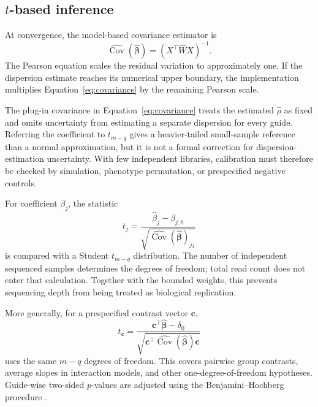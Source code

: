 \subsection{\texorpdfstring{$t$-based inference}{t-based inference}}
\label{sec:inference}

At convergence, the model-based covariance estimator is
\begin{equation}
  \widehat{\operatorname{Cov}}
  (\widehat{\boldsymbol{\beta}})
  =(X^\top\widehat{W}X)^{-1}.
  \label{eq:covariance}
\end{equation}
The Pearson equation scales the residual variation to approximately one.  If
the dispersion estimate reaches its numerical upper boundary, the implementation multiplies Equation~\eqref{eq:covariance} by the
remaining Pearson scale.

The plug-in covariance in Equation~\eqref{eq:covariance} treats the estimated
$\widehat{\rho}$ as fixed and omits uncertainty from estimating a separate
dispersion for every guide.  Referring the coefficient to $t_{m-q}$ gives a
heavier-tailed small-sample reference than a normal approximation, but it is
not a formal correction for dispersion-estimation uncertainty.  With few
independent libraries, calibration must therefore be checked by simulation,
phenotype permutation, or prespecified negative controls.

For coefficient $\beta_j$, the statistic
\begin{equation}
  t_j =
  \frac{\widehat{\beta}_j-\beta_{j,0}}
  {\sqrt{
  \widehat{\operatorname{Cov}}
  (\widehat{\boldsymbol{\beta}})_{jj}}}
  \label{eq:tstat}
\end{equation}
is compared with a Student $t_{m-q}$ distribution.  The number of independent sequenced samples determines the degrees of freedom;
total read count does not enter that calculation.  Together with the bounded weights, this prevents sequencing depth
from being treated as biological replication.

More generally, for a prespecified contrast vector $\mathbf{c}$,
\begin{equation}
  t_{\mathbf{c}} =
  \frac{\mathbf{c}^\top\widehat{\boldsymbol{\beta}}-\delta_0}
  {\sqrt{\mathbf{c}^\top
  \widehat{\operatorname{Cov}}(\widehat{\boldsymbol{\beta}})
  \mathbf{c}}}
\end{equation}
uses the same $m-q$ degrees of freedom.  This covers pairwise group contrasts,
average slopes in interaction models, and other one-degree-of-freedom
hypotheses.  Guide-wise two-sided $p$-values are adjusted using the
Benjamini--Hochberg procedure \citep{benjamini1995controlling}.

